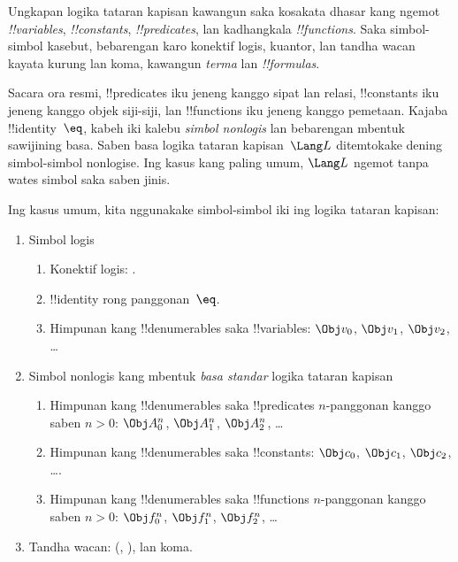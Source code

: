 \documentclass[../../../include/open-logic-section]{subfiles}
\begin{document}



Ungkapan logika tataran kapisan kawangun saka kosakata dhasar kang ngemot
\emph{!!{variable}s}, \emph{!!{constant}s}, \emph{!!{predicate}s}, lan
kadhangkala \emph{!!{function}s}. Saka simbol-simbol kasebut, bebarengan
karo konektif logis, kuantor, lan tandha wacan kayata kurung lan koma,
kawangun \emph{terma} lan \emph{!!{formula}s}.

\begin{explain}
Sacara ora resmi, !!{predicate}s iku jeneng kanggo sipat lan relasi,
!!{constant}s iku jeneng kanggo objek siji-siji, lan !!{function}s iku
jeneng kanggo pemetaan. Kajaba !!{identity}~$\eq$, kabeh iki kalebu
\emph{simbol nonlogis} lan bebarengan mbentuk sawijining basa. Saben
basa logika tataran kapisan~$\Lang L$ ditemtokake dening simbol-simbol
nonlogise. Ing kasus kang paling umum, $\Lang L$ ngemot tanpa wates
simbol saka saben jinis.
\end{explain}

Ing kasus umum, kita nggunakake simbol-simbol iki ing logika tataran
kapisan:

\begin{enumerate}
\item Simbol logis
\begin{enumerate}
\item Konektif logis:
  \startycommalist
  .
\item !!{identity} rong panggonan~$\eq$.
\item Himpunan kang !!{denumerable}s saka !!{variable}s: $\Obj v_0$, $\Obj v_1$, $\Obj
  v_2$, \dots
\end{enumerate}
\item Simbol nonlogis kang mbentuk \emph{basa standar} logika tataran
  kapisan
\begin{enumerate}
\item Himpunan kang !!{denumerable}s saka !!{predicate}s $n$-panggonan
  kanggo saben $n>0$: $\Obj
  A^n_0$, $\Obj A^n_1$, $\Obj A^n_2$, \dots
\item Himpunan kang !!{denumerable}s saka !!{constant}s: $\Obj c_0$, $\Obj c_1$, $\Obj
  c_2$, \dots.
\item Himpunan kang !!{denumerable}s saka !!{function}s $n$-panggonan
  kanggo saben $n>0$:
  $\Obj f^n_0$, $\Obj f^n_1$, $\Obj f^n_2$, \dots
\end{enumerate}
\item Tandha wacan: (, ), lan koma.
\end{enumerate}
\end{document}
